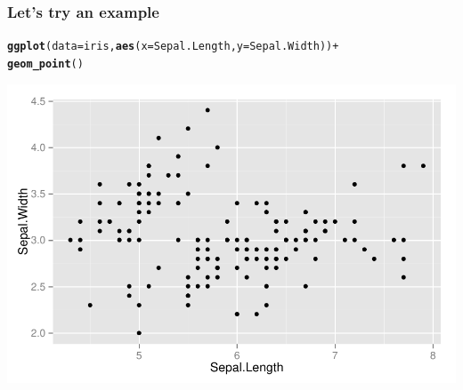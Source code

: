 \documentclass{beamer}\usepackage[]{graphicx}\usepackage[]{color}
\makeatletter
\newcommand{\hlopt}[1]{\textcolor[rgb]{0,0,0}{#1}}%
\newcommand{\hlstd}[1]{\textcolor[rgb]{0.345,0.345,0.345}{#1}}%
\newcommand{\hlkwc}[1]{\textcolor[rgb]{0.333,0.667,0.333}{#1}}%
\newcommand{\hlkwd}[1]{\textcolor[rgb]{0.737,0.353,0.396}{\textbf{#1}}}%
\newenvironment{kframe}{%
 \def\at@end@of@kframe{}%
 \ifinner\ifhmode%
  \def\at@end@of@kframe{\end{minipage}}%
  \begin{minipage}{\columnwidth}%
 \fi\fi%
 \def\FrameCommand##1{\hskip\@totalleftmargin \hskip-\fboxsep
 \colorbox{shadecolor}{##1}\hskip-\fboxsep
     \hskip-\linewidth \hskip-\@totalleftmargin \hskip\columnwidth}%
 \MakeFramed {\advance\hsize-\width
   \@totalleftmargin\z@ \linewidth\hsize
   \@setminipage}}%
 {\par\unskip\endMakeFramed%
 \at@end@of@kframe}
\newenvironment{knitrout}{}{} %
\makeatother
\begin{document}
\begin{frame}[fragile]
\frametitle{Let's try an example}
\begin{knitrout}\footnotesize
{}\color{fgcolor}\begin{kframe}
\begin{alltt}
\hlkwd{ggplot}\hlstd{(}\hlkwc{data} \hlstd{= iris,} \hlkwd{aes}\hlstd{(}\hlkwc{x} \hlstd{= Sepal.Length,} \hlkwc{y} \hlstd{= Sepal.Width))} \hlopt{+}
\hlkwd{geom_point}\hlstd{()}
\end{alltt}
\end{kframe}

{\centering \includegraphics[width=.75\linewidth]{figure/first_plot_} 

}



\end{knitrout}
\end{frame}

\end{document}
